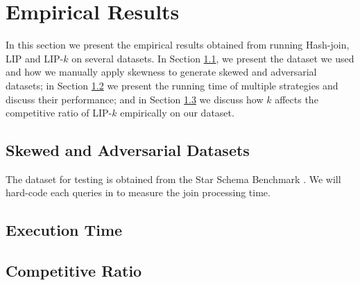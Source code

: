 
\section{Empirical Results}\label{sec:experiment}

In this section we present the empirical results obtained from running Hash-join, LIP and LIP-$k$ on several datasets. In Section \ref{sec:dataset}, we present the dataset we used and how we manually apply skewness to generate skewed and adversarial datasets; in Section \ref{sec:time} we present the running time of multiple strategies and discuss their performance; and in Section \ref{sec:ratio} we discuss how $k$ affects the competitive ratio of LIP-$k$ empirically on our dataset.



\subsection{Skewed and Adversarial Datasets}
\label{sec:dataset}
The dataset for testing is obtained from the Star Schema Benchmark \cite{o2009star}. We will hard-code each queries in \cite{o2009star} to measure the join processing time.



\subsection{Execution Time}
\label{sec:time}



\subsection{Competitive Ratio}
\label{sec:ratio}
